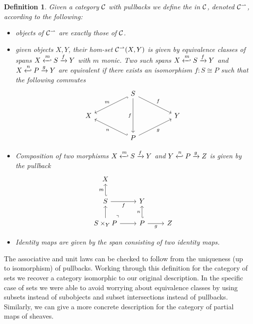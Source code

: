 \documentclass[12pt]{article}
\newtheorem{defn}[thrm]{Definition}
\begin{document}
\begin{defn}
  Given a category \(\mathcal{C}\) with pullbacks we define the  in \(\mathcal{C}\), denoted \({\mathcal{C}}^\rightharpoonup\), according to the following:
  \begin{itemize}
    \item objects of \({\mathcal{C}}^\rightharpoonup\) are exactly those of \(\mathcal{C}\).
    \item given objects \(X,Y\), their hom-set \({\mathcal{C}}^\rightharpoonup(X,Y)\) is given by
      equivalence classes of spans \(X \xhookleftarrow{m} S \xrightarrow{f} Y\)
      with \(m\) monic. Two such spans
      \(X \xhookleftarrow{m} S \xrightarrow{f} Y\) and
      \(X \xhookleftarrow{n} P \xrightarrow{g} Y\) are equivalent if there
      exists an isomorphism \(f : S \cong P\) such that the following commutes
      \[\begin{tikzcd}
          && S \\
          X &&&& Y \\
          && P \arrow["m"', hook, from=1-3, to=2-1] \arrow["f", from=1-3, to=2-5] \arrow["f"', from=1-3, to=3-3] \arrow["n", hook', from=3-3, to=2-1] \arrow["g"', from=3-3, to=2-5]
        \end{tikzcd}\]
    \item Composition of two morphisms
      \(X \xhookleftarrow{m} S \xrightarrow{f} Y\) and
      \(Y \xhookleftarrow{n} P \xrightarrow{g} Z\) is given by the pullback
      \[\begin{tikzcd}
          X \\
          S & Y \\
          {S\times_YP} & P & Z \arrow["m", hook', from=2-1, to=1-1] \arrow["f"', from=2-1, to=2-2] \arrow[from=3-1, to=2-1] \arrow["\lrcorner"{anchor=center, pos=0.125, rotate=90}, draw=none, from=3-1, to=2-2] \arrow[from=3-1, to=3-2] \arrow["n", hook', from=3-2, to=2-2] \arrow["g"', from=3-2, to=3-3]
        \end{tikzcd}\]
    \item Identity maps are given by the span consisting of two identity maps.
  \end{itemize}
\end{defn}

The associative and unit laws can be checked to follow from the uniqueness (up
to isomorphism) of pullbacks. Working through this definition for the category
of sets we recover a category isomorphic to our original description. In the
specific case of sets we were able to avoid worrying about equivalence classes
by using subsets instead of subobjects and subset intersections instead of
pullbacks. Similarly, we can give a more concrete description for the category
of partial maps of sheaves.
\end{document}
